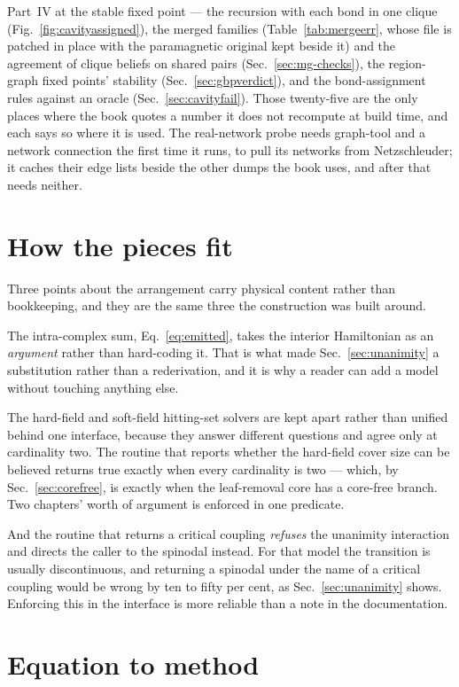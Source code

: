 Part~IV at the stable fixed point --- the recursion with each bond in one
clique (Fig.~\ref{fig:cavityassigned}), the merged families
(Table~\ref{tab:mergeerr}, whose file is patched in place with the
paramagnetic original kept beside it) and the agreement of clique beliefs
on shared pairs (Sec.~\ref{sec:mg-checks}), the region-graph fixed points' stability
(Sec.~\ref{sec:gbpverdict}), and the bond-assignment rules against an
oracle (Sec.~\ref{sec:cavityfail}). Those twenty-five are the only
places where the book quotes a number it does not recompute at build time,
and each says so where it is used. The real-network probe needs graph-tool and a network
connection the first time it runs, to pull its networks from Netzschleuder; it
caches their edge lists beside the other dumps the book uses, and after that
needs neither.

\section*{How the pieces fit}

Three points about the arrangement carry physical content rather than
bookkeeping, and they are the same three the construction was built around.

The intra-complex sum, Eq.~\eqref{eq:emitted}, takes the interior Hamiltonian as
an \emph{argument} rather than hard-coding it. That is what made
Sec.~\ref{sec:unanimity} a substitution rather than a rederivation, and it is
why a reader can add a model without touching anything else.

The hard-field and soft-field hitting-set solvers are kept apart rather than
unified behind one interface, because they answer different questions and agree
only at cardinality two. The routine that reports whether the hard-field cover
size can be believed returns true exactly when every cardinality is two ---
which, by Sec.~\ref{sec:corefree}, is exactly when the leaf-removal core has a
core-free branch. Two chapters' worth of argument is enforced in one predicate.

And the routine that returns a critical coupling \emph{refuses} the unanimity
interaction and directs the caller to the spinodal instead. For that model the
transition is usually discontinuous, and returning a spinodal under the name of
a critical coupling would be wrong by ten to fifty per cent, as
Sec.~\ref{sec:unanimity} shows. Enforcing this in the interface is more
reliable than a note in the documentation.

\section*{Equation to method}

